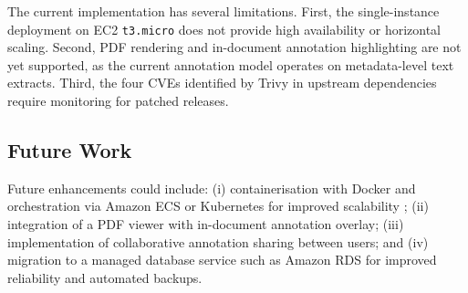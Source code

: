 \documentclass[conference]{IEEEtran}
\begin{document}
The current implementation has several limitations. First, the single-instance deployment on EC2 \texttt{t3.micro} does not provide high availability or horizontal scaling. Second, PDF rendering and in-document annotation highlighting are not yet supported, as the current annotation model operates on metadata-level text extracts. Third, the four CVEs identified by Trivy in upstream dependencies require monitoring for patched releases.

\subsection{Future Work}

Future enhancements could include: (i) containerisation with Docker and orchestration via Amazon ECS or Kubernetes for improved scalability \cite{burns2016kubernetes}; (ii) integration of a PDF viewer with in-document annotation overlay; (iii) implementation of collaborative annotation sharing between users; and (iv) migration to a managed database service such as Amazon RDS for improved reliability and automated backups.
\end{document}
